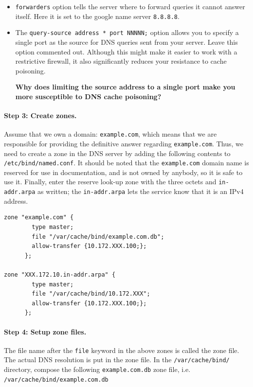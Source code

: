 \documentclass{article}
\begin{document}
\begin{itemize}
\item {\tt forwarders} option tells the server where to forward queries it cannot answer itself. Here it is set to the google name server {\tt 8.8.8.8}.  

\item  The {\tt query-source address * port NNNNN;} option allows you to specify a single port as the source for DNS queries sent from your server. Leave this option commented out. Although this might make it easier to work with a restrictive firewall, it also significantly reduces your resistance to cache poisoning.

\textbf{ \question  Why does limiting the source address to a single port make you more susceptible to DNS cache poisoning?}
\end{itemize}


\paragraph{Step 3: Create zones.}
Assume that we own a domain: {\tt example.com}, which means that we are 
responsible for providing the
definitive answer regarding {\tt example.com}. Thus, we need to create a zone 
in the DNS server by adding the following contents to {\tt /etc/bind/named.conf}.
It should be noted that the {\tt example.com}
domain name is reserved for use in documentation, and is not owned
by anybody, so it is safe to use it. Finally, enter the reserve look-up zone with the three octets and {\tt in-addr.arpa} as written; the {\tt in-addr.arpa} lets the service know that it is an IPv4 address.  

\begin{verbatim}
zone "example.com" {
        type master;
        file "/var/cache/bind/example.com.db"; 
        allow-transfer {10.172.XXX.100;};
      };

zone "XXX.172.10.in-addr.arpa" {
        type master;
        file "/var/cache/bind/10.172.XXX";
        allow-transfer {10.172.XXX.100;};
      };
\end{verbatim}

\paragraph{Step 4: Setup zone files.}
The file name after the {\tt file} keyword in the above zones is called 
the zone file. The actual DNS resolution is put in the zone file. 
In the \texttt{/var/cache/bind/} directory, compose the following \texttt{example.com.db} zone file, i.e.
{\tt /var/cache/bind/example.com.db}
\end{document}
